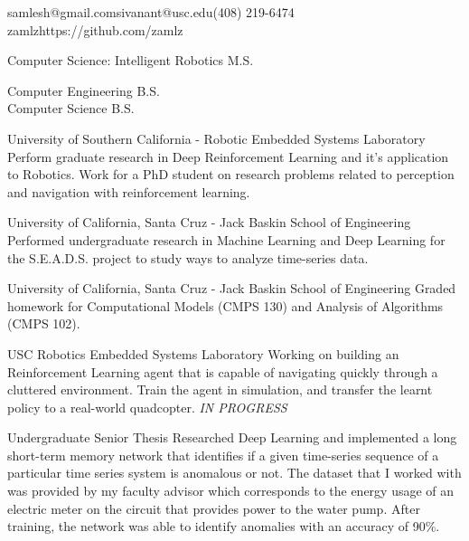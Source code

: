 \documentclass{resume}
\begin{document}
{samlesh@gmail.com}{sivanant@usc.edu}{(408) 219-6474}
{zamlz}{https://github.com/zamlz}


Computer Science: Intelligent Robotics M.S.

Computer Engineering B.S. \\ Computer Science B.S.


{University of Southern California - Robotic Embedded Systems Laboratory}
{Perform graduate research in Deep Reinforcement Learning and it's application
to Robotics. Work for a PhD student on research problems related to perception
and navigation with reinforcement learning.}

{University of California, Santa Cruz - Jack Baskin School of Engineering}
{Performed undergraduate research in Machine Learning and Deep Learning 
for the S.E.A.D.S. project to study ways to analyze time-series data.}

{University of California, Santa Cruz - Jack Baskin School of Engineering}
{Graded homework for Computational Models (CMPS 130) and Analysis of 
Algorithms (CMPS 102).}


{USC Robotics Embedded Systems Laboratory}
{Working on building an Reinforcement Learning agent that is capable of
navigating quickly through a cluttered environment. Train the agent in
simulation, and transfer the learnt policy to a real-world quadcopter.
\textit{IN PROGRESS}}{}

{Undergraduate Senior Thesis}
{Researched Deep Learning and implemented a long short-term memory
network that identifies if a given time-series sequence of a particular
time series system is anomalous or not. The dataset that I worked with
was provided by my faculty advisor which corresponds to the energy usage
of an electric meter on the circuit that provides power to the water
pump. After training, the network was able to identify anomalies with
an accuracy of 90\%.}{}
\end{document}
